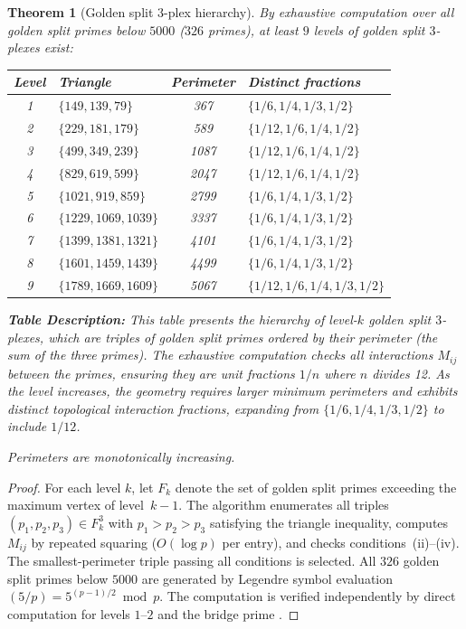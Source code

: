 \documentclass[12pt,oneside]{article}
\theoremstyle{principia}
\newtheorem{theorem}{Theorem}[section]
\theoremstyle{definition}
\theoremstyle{remark}
\begin{document}
\begin{theorem}[Golden split $3$-plex hierarchy]
\label{thm:hierarchy}
By exhaustive computation over all golden split primes below $5000$
($326$ primes), at least $9$ levels of golden split $3$-plexes exist:

\begin{center}
\begin{tabular}{@{}clcl@{}}
\toprule
Level & Triangle & Perimeter & Distinct fractions \\
\midrule
1 & $\{149, 139, 79\}$   & 367  & $\{1/6,1/4,1/3,1/2\}$ \\
2 & $\{229, 181, 179\}$   & 589  & $\{1/12,1/6,1/4,1/2\}$ \\
3 & $\{499, 349, 239\}$   & 1087 & $\{1/12,1/6,1/4,1/2\}$ \\
4 & $\{829, 619, 599\}$   & 2047 & $\{1/12,1/6,1/4,1/2\}$ \\
5 & $\{1021, 919, 859\}$  & 2799 & $\{1/6,1/4,1/3,1/2\}$ \\
6 & $\{1229, 1069, 1039\}$ & 3337 & $\{1/6,1/4,1/3,1/2\}$ \\
7 & $\{1399, 1381, 1321\}$ & 4101 & $\{1/6,1/4,1/3,1/2\}$ \\
8 & $\{1601, 1459, 1439\}$ & 4499 & $\{1/6,1/4,1/3,1/2\}$ \\
9 & $\{1789, 1669, 1609\}$ & 5067 & $\{1/12,1/6,1/4,1/3,1/2\}$ \\
\bottomrule
\end{tabular}
\end{center}
\textbf{Table Description:} This table presents the hierarchy of \emph{level-$k$} golden split $3$-plexes, which are triples of golden split primes ordered by their perimeter (the sum of the three primes). The exhaustive computation checks all interactions $M_{ij}$ between the primes, ensuring they are unit fractions $1/n$ where $n$ divides 12. As the level increases, the geometry requires larger minimum perimeters and exhibits distinct topological interaction fractions, expanding from $\{1/6, 1/4, 1/3, 1/2\}$ to include $1/12$.

Perimeters are monotonically increasing.
\end{theorem}

\begin{proof}
For each level $k$, let $F_k$ denote the set of golden split primes
exceeding the maximum vertex of level~$k-1$. The algorithm enumerates
all triples $(p_1, p_2, p_3) \in F_k^3$ with $p_1 > p_2 > p_3$
satisfying the triangle inequality, computes $M_{ij}$ by repeated
squaring ($O(\log p)$ per entry), and checks conditions~(ii)--(iv).
The smallest-perimeter triple passing all conditions is selected.
All $326$ golden split primes below $5000$ are generated by Legendre
symbol evaluation $(5/p) = 5^{(p-1)/2} \bmod p$. The computation is
verified independently by direct computation for levels $1$--$2$ and the bridge
prime \cite{lockwood_larue_dwm}. \qedhere
\end{proof}
\end{document}
